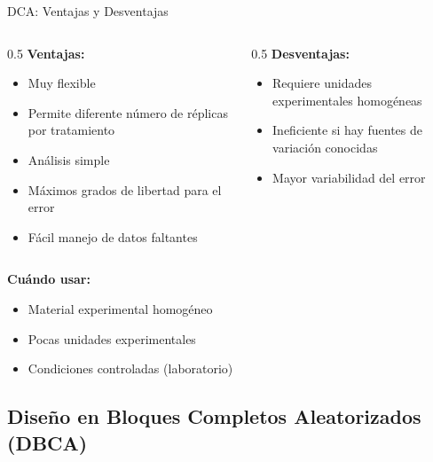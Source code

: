 \documentclass[aspectratio=169]{beamer}
\begin{document}
\begin{frame}{DCA: Ventajas y Desventajas}
\begin{columns}
\begin{column}{0.5\textwidth}
\textbf{Ventajas:}
\begin{itemize}
\item Muy flexible
\item Permite diferente número de réplicas por tratamiento
\item Análisis simple
\item Máximos grados de libertad para el error
\item Fácil manejo de datos faltantes
\end{itemize}
\end{column}
\begin{column}{0.5\textwidth}
\textbf{Desventajas:}
\begin{itemize}
\item Requiere unidades experimentales homogéneas
\item Ineficiente si hay fuentes de variación conocidas
\item Mayor variabilidad del error
\end{itemize}
\end{column}
\end{columns}

\vspace{0.4cm}
\textbf{Cuándo usar:}
\begin{itemize}
\item Material experimental homogéneo
\item Pocas unidades experimentales
\item Condiciones controladas (laboratorio)
\end{itemize}
\end{frame}

\subsection{Diseño en Bloques Completos Aleatorizados (DBCA)}
\end{document}
